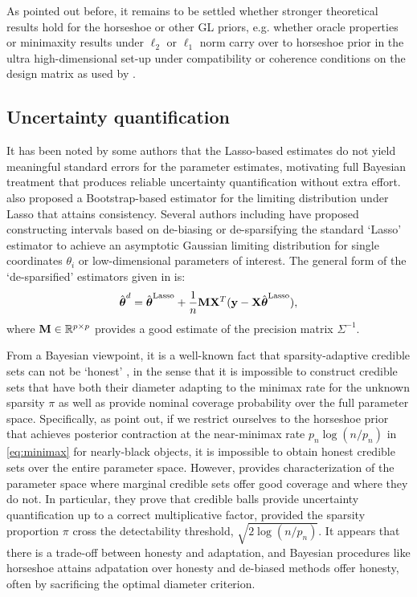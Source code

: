\documentclass[sts,preprint]{imsart}
\begin{document}
As pointed out before, it remains to be settled whether stronger theoretical results hold for the horseshoe or other GL priors, e.g. whether oracle properties or minimaxity results under $\ell_2$ or $\ell_1$ norm carry over to horseshoe prior in the ultra high-dimensional set-up under compatibility or coherence conditions on the design matrix as used by \citet{buhlmann2011statistics, castillo2015bayesian}. 

\subsection{Uncertainty quantification}

It has been noted by some authors \citep{chatterjee2011bootstrapping} that the Lasso-based estimates do not yield meaningful standard errors for the parameter estimates, motivating full Bayesian treatment that produces reliable uncertainty quantification without extra effort. \citet{chatterjee2011bootstrapping} also proposed a Bootstrap-based estimator for the limiting distribution under Lasso that attains consistency. Several authors including \citet{liu2013asymptotic, zhang2014confidence, van2014asymptotically, javanmard2014confidence} have proposed constructing intervals based on de-biasing or de-sparsifying the standard `Lasso' estimator to achieve an asymptotic Gaussian limiting distribution for single coordinates $\theta_i$ or low-dimensional parameters of interest. The general form of the `de-sparsified' estimators given in \citet{javanmard2014confidence} is:
\[
\hat{\boldsymbol{\theta}}^d = \hat{\boldsymbol{\theta}}^{\text{Lasso}} + \frac{1}{n} {\bf M} {\bf X}^T ({\bf y} - {\bf X} \hat{\boldsymbol{\theta}}^{\text{Lasso}}),
\]
where ${\bf M} \in \mathbb{R}^{p \times p}$ provides a good estimate of the precision matrix $\Sigma^{-1}$. 



From a Bayesian viewpoint, it is a well-known fact that sparsity-adaptive credible sets can not be `honest' \citep{nickl2013confidence,li1989honest}, in the sense that it is impossible to construct credible sets that have both their diameter adapting to the minimax rate for the unknown sparsity $\pi$ as well as provide nominal coverage probability over the full parameter space. Specifically, as \cite{van2017adaptive} point out, if we restrict ourselves to the horseshoe prior that achieves posterior contraction at the near-minimax rate $p_n \log(n/p_n)$ in \eqref{eq:minimax} for nearly-black objects, it is impossible to obtain honest credible sets over the entire parameter space. However, \cite{van2017adaptive} provides characterization of the parameter space where marginal credible sets offer good coverage and where they do not. In particular, they prove that credible balls provide uncertainty quantification up to a correct multiplicative factor, provided the sparsity proportion $\pi$ cross the detectability threshold, $\sqrt{2 \log(n/p_n)}$. It appears that there is a trade-off between honesty and adaptation, and Bayesian procedures like horseshoe attains adpatation over honesty and de-biased methods offer honesty, often by sacrificing the optimal diameter criterion. 
\end{document}
